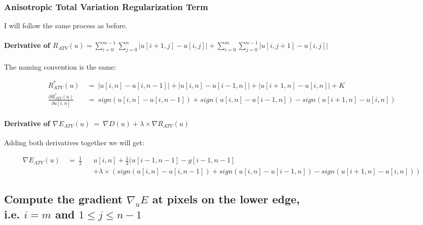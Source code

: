 \documentclass{report}
\begin{document}
			\subsubsection{Anisotropic Total Variation Regularization Term}
			\startsubsection
				I will follow the same process as before.
				\vspace{-0.4cm} \paragraph{Derivative of $R_{ATV}(u) = \sum_{i=0}^{m-1} \sum_{j=0}^{n} | u[i+1,j] - u[i,j] | + \sum_{i=0}^{m} \sum_{j=0}^{n-1} | u[i,j+1] - u[i,j] |$}
				\startsubsection
					\vspace{0.2cm} The naming convention is the same:
				\closesection
				\begin{adjustwidth}{-4em}{}
					\vspace{-0.5cm}
					\begin{align*}
						R_{ATV}^*(u) \ & = \ |u[i,n] - u[i,n-1]| + |u[i,n] - u[i-1,n]| + |u[i+1,n] - u[i,n]| + K \\
						\frac{\partial R_{ATV}^*(u)}{\partial u[i,n]} \ & = \ sign(u[i,n] - u[i,n-1]) + sign(u[i,n] - u[i-1,n]) - sign(u[i+1,n] - u[i,n])
					\end{align*}
				\end{adjustwidth}
				\vspace{-0.4cm} \paragraph{Derivative of $\nabla E_{ATV}(u) \ = \ \nabla D(u) + \lambda \times \nabla R_{ATV}(u)$}
				\startsubsection
					Adding both derivatives together we will get:
				\closesection
				\begin{adjustwidth}{-6em}{}
					\vspace{-0.6cm}
					\begin{align*}
						\nabla E_{ATV}(u) \ & = \ \frac{1}{2} && u[i,n]  + \frac{1}{2} (u[i-1,n-1] - g[i-1,n-1] \\
						&&& + \lambda \times (sign(u[i,n] - u[i,n-1]) + sign(u[i,n] - u[i-1,n]) - sign(u[i+1,n] - u[i,n]))
					\end{align*}
				\end{adjustwidth}
			\closesection
		\closesection
		
		\newpage
		
		\subsection{Compute the gradient $\nabla_u E$ at pixels on the lower edge, \\ i.e. $i = m$ and $1 \leq j \leq n-1$}
		\startsubsection
\end{document}
